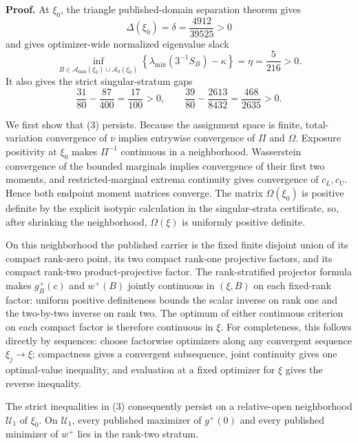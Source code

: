 \textbf{Proof.}
At \(\xi_0\), the triangle published-domain separation theorem gives
\[
\Delta(\xi_0)=\delta=\frac{4912}{39525}>0
\tag{1}
\]
and gives optimizer-wide normalized eigenvalue slack
\[
\inf_{B\in\mathcal A_{\mathrm{mm}}(\xi_0)\cup\mathcal A_0(\xi_0)}
\left\{\lambda_{\min}(3^{-1}S_B)-\kappa\right\}
=\eta=\frac5{216}>0.
\tag{2}
\]
It also gives the strict singular-stratum gaps
\[
\frac{31}{80}-\frac{87}{400}=\frac{17}{100}>0,
\qquad
\frac{39}{80}-\frac{2613}{8432}=\frac{468}{2635}>0.
\tag{3}
\]

We first show that (3) persists.  Because the assignment space is finite, total-variation convergence of \(\nu\) implies entrywise convergence of \(\Pi\) and \(\Omega\).  Exposure positivity at \(\xi_0\) makes \(\Pi^{-1}\) continuous in a neighborhood.  Wasserstein convergence of the bounded marginals implies convergence of their first two moments, and restricted-marginal extrema continuity gives convergence of \(c_L,c_U\).  Hence both endpoint moment matrices converge.  The matrix \(\Omega(\xi_0)\) is positive definite by the explicit isotypic calculation in the singular-strata certificate, so, after shrinking the neighborhood, \(\Omega(\xi)\) is uniformly positive definite.

On this neighborhood the published carrier is the fixed finite disjoint union of its compact rank-zero point, its two compact rank-one projective factors, and its compact rank-two product-projective factor.  The rank-stratified projector formula makes \(g_B^+(c)\) and \(w^+(B)\) jointly continuous in \((\xi,B)\) on each fixed-rank factor: uniform positive definiteness bounds the scalar inverse on rank one and the two-by-two inverse on rank two.  The optimum of either continuous criterion on each compact factor is therefore continuous in \(\xi\).  For completeness, this follows directly by sequences: choose factorwise optimizers along any convergent sequence \(\xi_j\to\xi\); compactness gives a convergent subsequence, joint continuity gives one optimal-value inequality, and evaluation at a fixed optimizer for \(\xi\) gives the reverse inequality.

The strict inequalities in (3) consequently persist on a relative-open neighborhood \(\mathcal U_1\) of \(\xi_0\).  On \(\mathcal U_1\), every published maximizer of \(g^+(0)\) and every published minimizer of \(w^+\) lies in the rank-two stratum.

